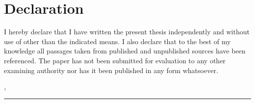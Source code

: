 %
\chapter*{Declaration}
\label{sec:declaration}
\thispagestyle{empty}

I hereby declare that I have written the present thesis independently and without use of other than the indicated means. I also declare that to the best of my knowledge all passages taken from published and unpublished sources have been referenced. The paper has not been submitted for evaluation to any other examining authority nor has it been published in any form whatsoever.

\bigskip

\noindent\textit{\thesisUniversityCity, \thesisDate}

\smallskip

\begin{flushright}
	\begin{minipage}{5cm}
		\rule{\textwidth}{1pt}
		\centering\thesisName
	\end{minipage}
\end{flushright}

